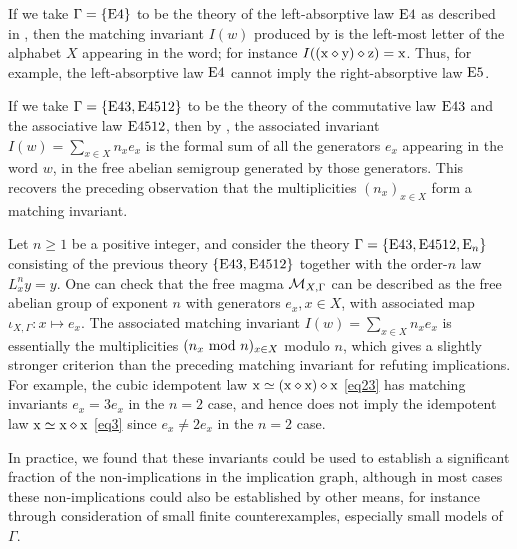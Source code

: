 \begin{example}  If we take $\Gamma = \{\mathrm{E}4\}$ to be the theory of the left-absorptive law $\mathrm{E}4$ as described in , then the matching invariant $I(w)$ produced by  is the left-most letter of the alphabet $X$ appearing in the word; for instance $I((\mathrm{x} \diamond \mathrm{y}) \diamond \mathrm{z}) = \mathrm{x}$.  Thus, for example, the left-absorptive law $\mathrm{E}4$ cannot imply the right-absorptive law $\mathrm{E}5$.
\end{example}

\begin{example}  If we take $\Gamma = \{\mathrm{E}43, \mathrm{E}4512\}$ to be the theory of the commutative law $\mathrm{E}43$ and the associative law $\mathrm{E}4512$, then by , the associated invariant $I(w) = \sum_{x \in X} n_x e_x$ is the formal sum of all the generators $e_x$ appearing in the word $w$, in the free abelian semigroup generated by those generators.  This recovers the preceding observation that the multiplicities $(n_x)_{x \in X}$ form a matching invariant.
\end{example}

\begin{example}  Let $n \geq 1$ be a positive integer, and consider the theory $\Gamma = \{\mathrm{E}43, \mathrm{E}4512, \mathrm{E}_n\}$ consisting of the previous theory $\{\mathrm{E}43, \mathrm{E}4512\}$ together with the order-$n$ law $L_x^n y = y$.  One can check that the free magma ${\mathcal{M}}_{X,\Gamma}$ can be described as the free abelian group of exponent $n$ with generators $e_x, x \in X$, with associated map $\iota_{X,\Gamma} \colon x \mapsto e_x$.  The associated matching invariant $I(w) = \sum_{x \in X} n_x e_x$ is essentially the multiplicities $(n_x \hbox{ mod } n)_{x \in X}$ modulo $n$, which gives a slightly stronger criterion than the preceding matching invariant for refuting implications.  For example, the cubic idempotent law $\mathrm{x} \simeq (\mathrm{x} \diamond \mathrm{x}) \diamond \mathrm{x}$ \eqref{eq23}
has matching invariants $e_x = 3e_x$ in the $n=2$ case, and hence does not imply the idempotent law $\mathrm{x} \simeq \mathrm{x} \diamond \mathrm{x}$ \eqref{eq3} since $e_x \neq 2e_x$ in the $n=2$ case.
\end{example}

In practice, we found that these invariants could be used to establish a significant fraction of the non-implications in the implication graph, although in most cases these non-implications could also be established by other means, for instance through consideration of small finite counterexamples, especially small models of~$\Gamma$.

